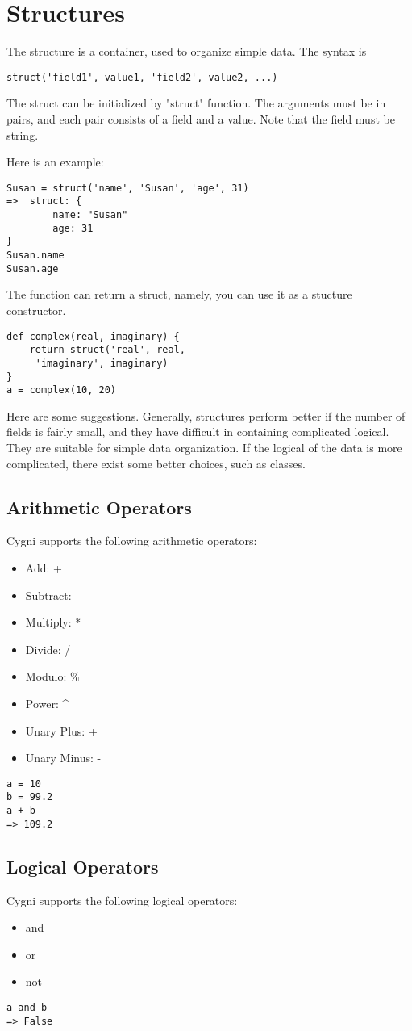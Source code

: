 \chapter{Structures}
The structure is a container, used to organize simple data. The syntax is
\begin{lstlisting}
struct('field1', value1, 'field2', value2, ...)
\end{lstlisting}
The struct can be initialized by "struct" function. The arguments must be in pairs, and each pair consists of a field and a value. Note that the field must be string.

Here is an example:
\begin{lstlisting}
Susan = struct('name', 'Susan', 'age', 31)
=>  struct: {
		name: "Susan"
		age: 31
}
Susan.name
Susan.age
\end{lstlisting}
The function can return a struct, namely, you can use it as a stucture constructor.

\begin{lstlisting}
def complex(real, imaginary) {
	return struct('real', real,
	 'imaginary', imaginary)
}
a = complex(10, 20)
\end{lstlisting}

Here are some suggestions. Generally, structures perform better if the number of fields is fairly small, and they have difficult in containing complicated logical. They are suitable for simple data organization. If the logical of the data is more complicated, there exist some better choices, such as classes. 

\section{Arithmetic Operators}
Cygni supports the following arithmetic operators:
 \begin{itemize}
 	\item Add: +
 	\item Subtract: -
 	\item Multiply: *
 	\item Divide: /
 	\item Modulo: \%
 	\item Power: \^{}
 	\item Unary Plus: +
 	\item Unary Minus: -
\end{itemize}
\begin{lstlisting}
a = 10
b = 99.2
a + b
=> 109.2
\end{lstlisting}
\section{Logical Operators}
Cygni supports the following logical operators:
\begin{itemize}
 	\item and
 	\item or
 	\item not
\end{itemize}
\begin{lstlisting}
a and b
=> False
\end{lstlisting}

